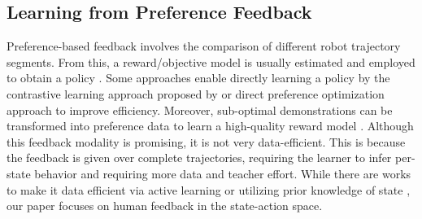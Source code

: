 
\subsection{Learning from Preference Feedback}
Preference-based feedback involves the comparison of different robot trajectory segments.
From this,
a reward/objective model is usually estimated and employed to obtain a policy \cite{2017_DRL_preference, 2015_IJRR_Preference_traj_ranking, 2021_Pebble_preference_RL, 2020_openai_RLHF, 2024_comparative_language}.
Some approaches enable directly learning a policy by the contrastive learning approach proposed by \cite{2023_Contrastive_Prefence_Learning, zhao2022calibrating} or direct preference optimization approach \cite{2023_DPO} to improve efficiency.
Moreover, sub-optimal demonstrations can be transformed into preference data to learn a high-quality reward model  \cite{2019_IRL_ranked_demonstration}. 
Although this feedback modality is promising, it is not very data-efficient. This is because the feedback is given over complete trajectories, requiring the learner to infer per-state behavior and requiring more data and teacher effort.
While there are works to make it data efficient via active learning \cite{2024batch_acitve_learning_Preference}  or utilizing prior knowledge of state \cite{2024hindsight_preference}, our paper focuses on human feedback in the state-action space.


